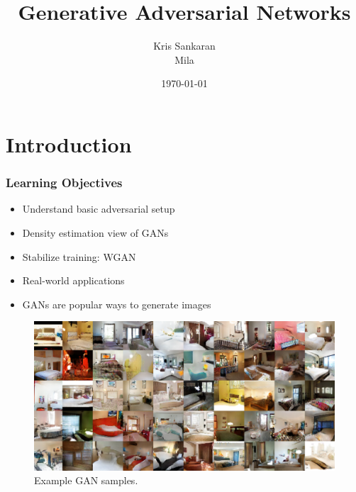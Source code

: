 \documentclass[10pt,mathserif]{beamer}
\title{\large \bfseries Generative Adversarial Networks}
\author{Kris Sankaran\\[3ex]
Mila}
\date{\today}
\begin{document}
\frame{
  \thispagestyle{empty}
  \titlepage
}

\section{Introduction}

\begin{frame}
  \frametitle{Learning Objectives}
 \begin{itemize}
  \item Understand basic adversarial setup
  \item Density estimation view of GANs
  \item Stabilize training: WGAN
  \item Real-world applications
 \end{itemize}
\end{frame}

\begin{frame}
\begin{itemize}
\item GANs are popular ways to generate images
\end{itemize}
\begin{figure}[ht]
  \centering
  \includegraphics[width=0.7\paperwidth]{figure/gan_example}
  \caption{Example GAN samples. \label{fig:gan_example} }
\end{figure}
\end{frame}
\end{document}
